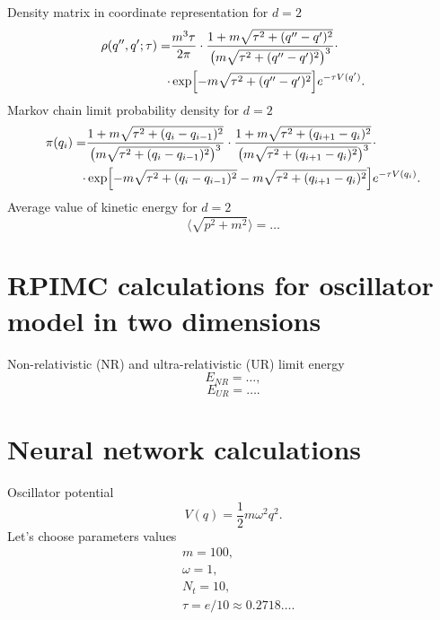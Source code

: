 \documentclass{article}
\begin{document}
	Density matrix in coordinate representation for $d = 2$
	\begin{align}
		\nonumber
		\rho (q '', q '; \tau) =& \frac{m ^ 3 \tau}{2 \pi} \cdot \frac{1 + m \sqrt{\tau ^ 2 + (q '' - q ') ^ 2}}{\bigl ( m \sqrt{\tau ^ 2 + (q '' - q ') ^ 2} \bigr ) ^ 3} \cdot \\
		\cdot& \exp \Bigl [ - m \sqrt{\tau ^ 2 + (q '' - q ') ^ 2} \Bigr ] e ^ {- \tau V (q ')}.
		\label{Density Matrix d = 2}
	\end{align}
	Markov chain limit probability density for $d = 2$
	\begin{align}
		\pi (q _ i) =& \frac{1 + m \sqrt{\tau ^ 2 + (q _ i - q _ {i - 1}) ^ 2}}{\bigl ( m \sqrt{\tau ^ 2 + (q _ i - q _ {i - 1}) ^ 2} \bigr ) ^ 3} \cdot \frac{1 + m \sqrt{\tau ^ 2 + (q _ {i + 1} - q _ i) ^ 2}}{\bigl ( m \sqrt{\tau ^ 2 + (q _ {i + 1} - q _ i) ^ 2} \bigr ) ^ 3} \cdot \\
		\cdot& \exp \Bigl [ - m \sqrt{\tau ^ 2 + (q _ i - q _ {i - 1}) ^ 2} - m \sqrt{\tau ^ 2 + (q _ {i + 1} - q _ i) ^ 2} \Bigr ] e ^ {- \tau V (q _ i)}.
		\label{MCLPD d = 2}
	\end{align}
	Average value of kinetic energy for $d = 2$
	\begin{equation}
		\langle \sqrt{p ^ 2 + m ^ 2} \rangle = \dots
		\label{Kinetic Energy d = 2}
	\end{equation}

\section{RPIMC calculations for oscillator model in two dimensions}
	Non-relativistic (NR) and ultra-relativistic (UR) limit energy
	\begin{equation}
		E _ {NR} = \dots ,
		\label{Non-relativistic energy d = 2}
	\end{equation}
	\begin{equation}
		E _ {UR} = \dots .
		\label{Ultra-relativistic energy d = 2}
	\end{equation}


\section{Neural network calculations}
	Oscillator potential
	\begin{equation}
		V (q) = \frac{1}{2} m \omega ^ 2 q ^ 2.
	\end{equation}
	Let's choose parameters values
	\begin{align}
		\nonumber
		& m = 100, \\
		\nonumber
		& \omega = 1, \\
		\nonumber
		& N _ t = 10, \\
		\nonumber
		& \tau = e / 10 \approx 0.2718 \dots .
	\end{align}
\end{document}
